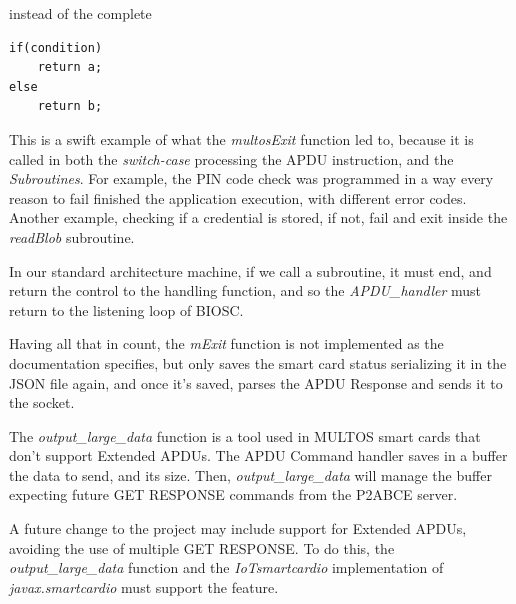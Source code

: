instead of the complete

\begin{verbatim}
if(condition)
    return a;
else
    return b;
\end{verbatim}

This is a swift example of what the \textit{multosExit} function led to, because it is called in both the \textit{switch-case} processing the APDU instruction, and the \textit{Subroutines}. For example, the PIN code check was programmed in a way every reason to fail finished the application execution, with different error codes. Another example, checking if a credential is stored, if not, fail and exit inside the \textit{readBlob} subroutine.

In our standard architecture machine, if we call a subroutine, it must end, and return the control to the handling function, and so the \textit{APDU\_handler} must return to the listening loop of BIOSC.

Having all that in count, the \textit{mExit} function is not implemented as the documentation specifies, but only saves the smart card status serializing it in the JSON file again, and once it's saved, parses the APDU Response and sends it to the socket.

The \textit{output\_large\_data} function is a tool used in MULTOS smart cards that don't support Extended APDUs. The APDU Command handler saves in a buffer the data to send, and its size. Then, \textit{output\_large\_data} will manage the buffer expecting future GET RESPONSE commands from the P2ABCE server.

A future change to the project may include support for Extended APDUs, avoiding the use of multiple GET RESPONSE. To do this, the \textit{output\_large\_data} function and the \textit{IoTsmartcardio} implementation of \textit{javax.smartcardio} must support the feature.













